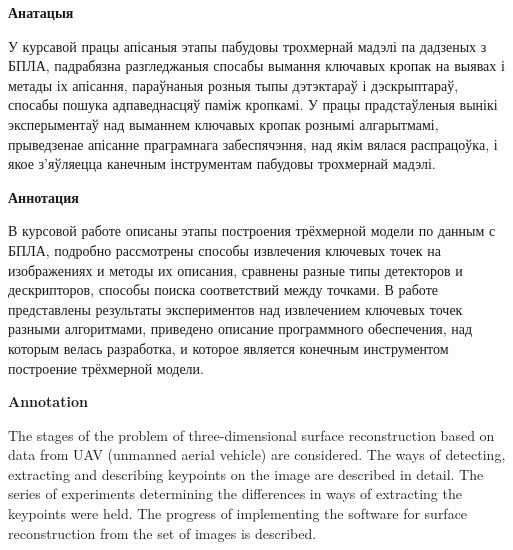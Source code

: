 \begin{center}
    {\bf Анатацыя}
\end{center}

У курсавой працы апісаныя этапы пабудовы трохмернай мадэлі па дадзеных з БПЛА,
падрабязна разгледжаныя спосабы вымання ключавых кропак на выявах і метады іх
апісання, параўнаныя розныя тыпы дэтэктараў і дэскрыптараў, спосабы пошука адпаведнасцяў паміж кропкамі.
У працы прадстаўленыя вынікі эксперыментаў над выманнем ключавых кропак рознымі алгарытмамі,
прыведзенае апісанне праграмнага забеспячэння, над якім вялася распрацоўка, і якое
з'яўляецца канечным інструментам пабудовы трохмернай мадэлі.

\begin{center}
    {\bf Аннотация}
\end{center}

В курсовой работе описаны этапы построения трёхмерной модели по данным с БПЛА,
подробно рассмотрены способы извлечения ключевых точек на изображениях и методы их
описания, сравнены разные типы детекторов и дескрипторов, способы поиска соответствий между точками.
В работе представлены результаты экспериментов над извлечением ключевых точек разными алгоритмами,
приведено описание программного обеспечения, над которым велась разработка, и которое
является конечным инструментом построение трёхмерной модели.

\begin{center}
    {\bf Annotation}
\end{center}

The stages of the problem of three-dimensional surface reconstruction based on data from UAV
(unmanned aerial vehicle) are considered. The ways of detecting, extracting and describing
keypoints on the image are described in detail. The series of experiments determining the differences
in ways of extracting the keypoints were held. The progress of implementing the software for surface reconstruction from
the set of images is described.

\newpage
